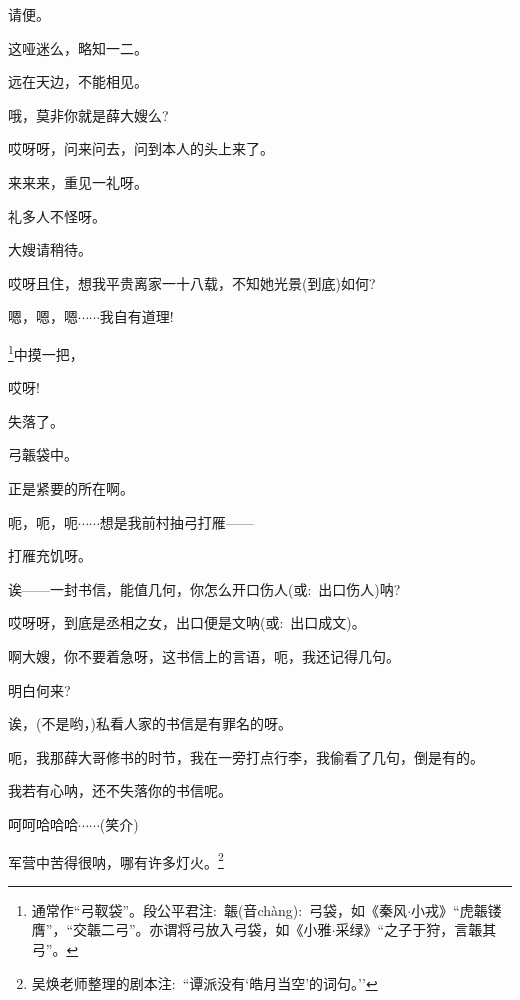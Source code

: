 {{{请便。}

{这哑迷么，略知一二。}

{远在天边，不能相见。}

{哦，莫非你就是薛大嫂么?}

{哎呀呀，问来问去，问到本人的头上来了。}

{来来来，重见一礼呀。}

{礼多人不怪呀。}

{大嫂请稍待。}

{哎呀且住，想我平贵离家一十八载，不知她光景(到底)如何?}

{嗯，嗯，嗯$\cdots{}\cdots{}$我自有道理!}

\footnote{通常作``弓靫袋''。段公平{\scriptsize 君}注:~{韔(音{\textrm ch\`ang}):~弓袋，如《秦风$\cdot$小戎》``虎韔镂膺''，``交韔二弓''。亦谓将弓放入弓袋，如《小雅$\cdot$采绿》``之子于狩，言韔其弓''。}}{中摸一把，}

{哎呀!}


{失落了。}

{弓韔袋中。}

{正是紧要的所在啊。}

{呃，呃，呃$\cdots{}\cdots{}$想是我前村抽弓打雁------}

{打雁充饥呀。}

{诶------一封书信，能值几何，你怎么开口伤人({\akai 或}:~出口伤人)呐?}

{哎呀呀，到底是丞相之女，出口便是文呐({\akai 或}:~出口成文)。}

{啊大嫂，你不要着急呀，这书信上的言语，呃，我还记得几句。}

{明白何来?}

{诶，(不是哟，)私看人家的书信是有罪名的呀。}

{呃，我那薛大哥修书的时节，我在一旁打点行李，我偷看了几句，倒是有的。}

{我若有心呐，还不失落你的书信呢。}

{呵呵哈哈哈$\cdots{}\cdots{}$({\hwfs 笑介})}


{军营中苦得很呐，哪有许多灯火。}\footnote{吴焕老师整理的剧本注:~``谭派没有`皓月当空'的词句。''}


}}
